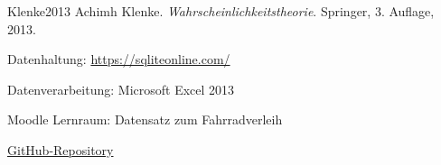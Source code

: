 \documentclass[a4paper,12pt]{article}
\begin{document}
\newpage
\begin{thebibliography}{9}
\item {Klenke2013} Achimh Klenke. \textit{Wahrscheinlichkeitstheorie}. Springer, 3. Auflage, 2013.
\item Datenhaltung: \url{https://sqliteonline.com/}
\item Datenverarbeitung: Microsoft Excel 2013
\item Moodle Lernraum: Datensatz zum Fahrradverleih\href{}{}
\item\href{https://GitHub.com/Amin607/Latex-Abgabe-Comet/commit/} 
{GitHub-Repository}
\end{thebibliography}
\end{document}
